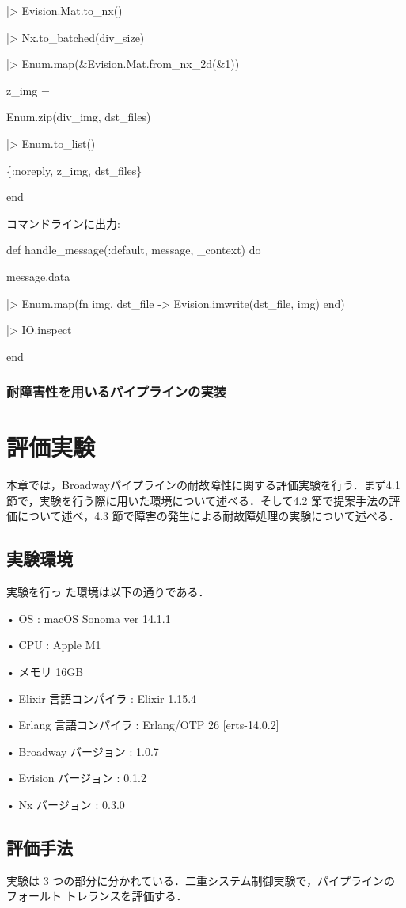 \documentclass[a4paper]{jreport}	%
\begin{document}
    |> Evision.Mat.to\_nx()
    
    |> Nx.to\_batched(div\_size)
    
    |> Enum.map(\&Evision.Mat.from\_nx\_2d(\&1))
    
    z\_img = 
    
    Enum.zip(div\_img, dst\_files)
    
    |> Enum.to\_list()
    
    \{:noreply, z\_img, dst\_files\}
  
end

コマンドラインに出力:

  def handle\_message(:default, message, \_context) do
  
    message.data
    
    |> Enum.map(fn {img, dst\_file} -> Evision.imwrite(dst\_file, img) end)
    
    |> IO.inspect
    
  end

\subsection{耐障害性を用いるパイプラインの実装}


\chapter{評価実験}
本章では，Broadwayパイプラインの耐故障性に関する評価実験を行う．まず4.1 節で，実験を行う際に用いた環境について述べる．そして4.2 節で提案手法の評価について述べ，4.3 節で障害の発生による耐故障処理の実験について述べる．
\section{実験環境}
実験を行っ た環境は以下の通りである．

• OS : macOS Sonoma ver 14.1.1 

• CPU : Apple M1

• メモリ 16GB 

• Elixir 言語コンパイラ : Elixir 1.15.4

• Erlang 言語コンパイラ : Erlang/OTP 26 [erts-14.0.2]

• Broadway バージョン :  1.0.7

• Evision バージョン :  0.1.2

• Nx バージョン :  0.3.0

\section{評価手法}
実験は 3 つの部分に分かれている．二重システム制御実験で，パイプラインのフォールト トレランスを評価する．
\end{document}
